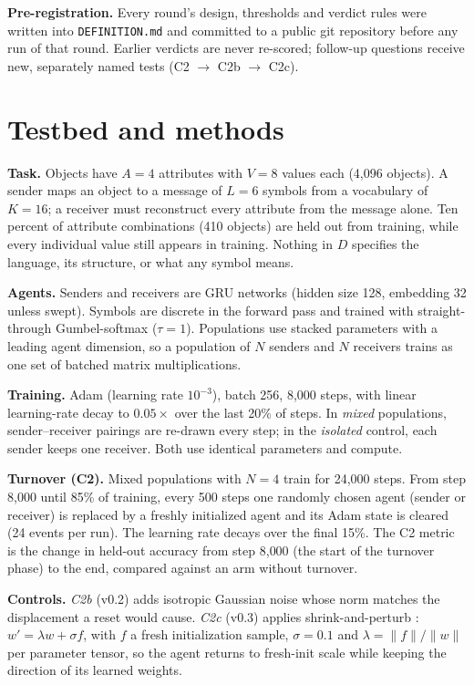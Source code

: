 \documentclass[11pt]{article}
\begin{document}
\textbf{Pre-registration.} Every round's design, thresholds and verdict rules were written into
\texttt{DEFINITION.md} and committed to a public git repository before any run of that round.
Earlier verdicts are never re-scored; follow-up questions receive new, separately named tests
(C2 $\rightarrow$ C2b $\rightarrow$ C2c).

\section{Testbed and methods}\label{sec:methods}

\textbf{Task.} Objects have $A{=}4$ attributes with $V{=}8$ values each (4{,}096 objects). A
sender maps an object to a message of $L{=}6$ symbols from a vocabulary of $K{=}16$; a receiver
must reconstruct every attribute from the message alone. Ten percent of attribute combinations
(410 objects) are held out from training, while every individual value still appears in training.
Nothing in $D$ specifies the language, its structure, or what any symbol means.

\textbf{Agents.} Senders and receivers are GRU networks (hidden size 128, embedding 32 unless
swept). Symbols are discrete in the forward pass and trained with straight-through
Gumbel-softmax ($\tau{=}1$). Populations use stacked parameters with a leading agent dimension,
so a population of $N$ senders and $N$ receivers trains as one set of batched matrix
multiplications.

\textbf{Training.} Adam (learning rate $10^{-3}$), batch 256, 8{,}000 steps, with linear
learning-rate decay to $0.05\times$ over the last 20\% of steps. In \emph{mixed} populations,
sender--receiver pairings are re-drawn every step; in the \emph{isolated} control, each sender
keeps one receiver. Both use identical parameters and compute.

\textbf{Turnover (C2).} Mixed populations with $N{=}4$ train for 24{,}000 steps. From step
8{,}000 until 85\% of training, every 500 steps one randomly chosen agent (sender or receiver)
is replaced by a freshly initialized agent and its Adam state is cleared (24 events per run).
The learning rate decays over the final 15\%. The C2 metric is the change in held-out accuracy
from step 8{,}000 (the start of the turnover phase) to the end, compared against an arm without turnover.

\textbf{Controls.} \emph{C2b} (v0.2) adds isotropic Gaussian noise whose norm matches the
displacement a reset would cause. \emph{C2c} (v0.3) applies shrink-and-perturb
\cite{ash2020}: $w' = \lambda w + \sigma f$, with $f$ a fresh initialization sample,
$\sigma{=}0.1$ and $\lambda = \|f\|/\|w\|$ per parameter tensor, so the agent returns to
fresh-init scale while keeping the direction of its learned weights.
\end{document}
